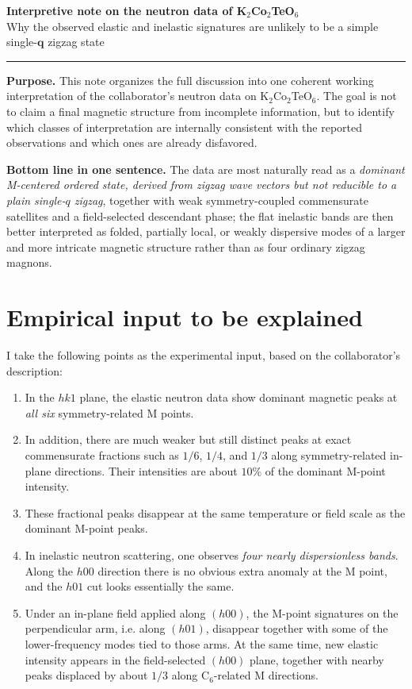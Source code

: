 \documentclass[11pt]{article}
\begin{document}
\begin{center}
    {\LARGE \textbf{Interpretive note on the neutron data of K$_2$Co$_2$TeO$_6$}}\\[0.6em]
    {\large Why the observed elastic and inelastic signatures are unlikely to be a simple single-$\bm{q}$ zigzag state}\\[1em]
    \rule{0.9\textwidth}{0.5pt}
\end{center}

\textbf{Purpose.} This note organizes the full discussion into one coherent working interpretation of the collaborator's neutron data on K$_2$Co$_2$TeO$_6$. The goal is not to claim a final magnetic structure from incomplete information, but to identify which classes of interpretation are internally consistent with the reported observations and which ones are already disfavored.

\textbf{Bottom line in one sentence.} The data are most naturally read as a \emph{dominant M-centered ordered state, derived from zigzag wave vectors but not reducible to a plain single-$q$ zigzag}, together with weak symmetry-coupled commensurate satellites and a field-selected descendant phase; the flat inelastic bands are then better interpreted as folded, partially local, or weakly dispersive modes of a larger and more intricate magnetic structure rather than as four ordinary zigzag magnons.

\section{Empirical input to be explained}

I take the following points as the experimental input, based on the collaborator's description:

\begin{enumerate}[leftmargin=2em,itemsep=0.35em]
    \item In the \(hk1\) plane, the elastic neutron data show dominant magnetic peaks at \emph{all six} symmetry-related M points.
    \item In addition, there are much weaker but still distinct peaks at exact commensurate fractions such as \(1/6\), \(1/4\), and \(1/3\) along symmetry-related in-plane directions. Their intensities are about \(10\%\) of the dominant M-point intensity.
    \item These fractional peaks disappear at the same temperature or field scale as the dominant M-point peaks.
    \item In inelastic neutron scattering, one observes \emph{four nearly dispersionless bands}. Along the \(h00\) direction there is no obvious extra anomaly at the M point, and the \(h01\) cut looks essentially the same.
    \item Under an in-plane field applied along \((h00)\), the M-point signatures on the perpendicular arm, i.e. along \((h01)\), disappear together with some of the lower-frequency modes tied to those arms. At the same time, new elastic intensity appears in the field-selected \((h00)\) plane, together with nearby peaks displaced by about \(1/3\) along C$_6$-related M directions.
\end{enumerate}
\end{document}
